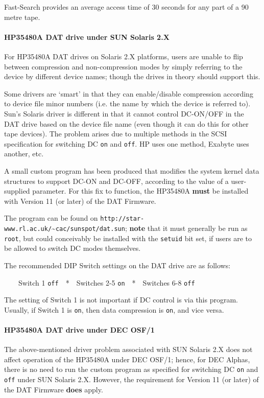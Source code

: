 Fast-Search provides an average access time of 30 seconds for any part of a
90 metre tape.

\paragraph {HP35480A DAT drive under SUN Solaris 2.X}

For HP35480A DAT drives on Solaris 2.X platforms, users are unable to flip
between compression and non-compression modes by simply referring to the
device by different device names; though the drives in theory should support
this.

Some drivers are `smart' in that they can enable/disable compression
according to device file minor numbers (i.e. the name by which the device
is referred to). Sun's Solaris driver is different in that it cannot control
DC-ON/OFF in the DAT drive based on the device file name (even though it can
do this for other tape devices). The problem arises due to multiple methods
in the SCSI specification for switching DC {\tt on} and {\tt off}. HP uses
one method, Exabyte uses another, etc.

A small custom program has been produced that modifies the system kernel
data structures to support DC-ON and DC-OFF, according to the value of a
user-supplied parameter. For this fix to function, the HP35480A {\bf must}
be installed with Version 11 (or later) of the DAT Firmware.

The program can be found on
{\tt http://star-www.rl.ac.uk/}\~{ }{\tt cac/sunspot/dat.sun}; {\bf note}
that it must generally be run as {\tt root}, but could conceivably be installed
with the {\tt setuid} bit set, if users are to be allowed to switch DC modes
themselves.

The recommended DIP Switch settings on the DAT drive are as follows:

\ \ \ \ Switch 1 {\tt off}\ \ *\ \ Switches 2-5 {\tt on}\ \ *\ \ Switches
6-8 {\tt off}

The setting of Switch 1 is not important if DC control is via this program.
Usually, if Switch 1 is {\tt on}, then data compression is {\tt on}, and vice
versa.

\paragraph {HP35480A DAT drive under DEC OSF/1}

The above-mentioned driver problem associated with SUN Solaris 2.X does not
affect operation of the HP35480A under DEC OSF/1; hence, for DEC Alphas,
there is no need to run the custom program as specified for switching DC
{\tt on} and {\tt off} under SUN Solaris 2.X. However, the requirement for
Version 11 (or later) of the DAT Firmware {\bf does} apply.

